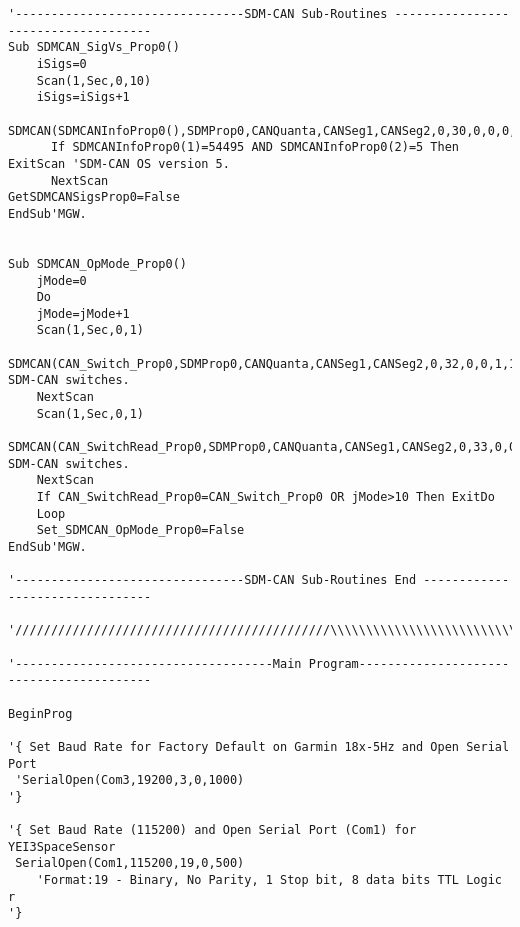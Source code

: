 \begin{lstlisting}[basicstyle=\tiny]
'--------------------------------SDM-CAN Sub-Routines ------------------------------------
Sub SDMCAN_SigVs_Prop0()
    iSigs=0
    Scan(1,Sec,0,10)
    iSigs=iSigs+1
    SDMCAN(SDMCANInfoProp0(),SDMProp0,CANQuanta,CANSeg1,CANSeg2,0,30,0,0,0,1.0,0.0)
      If SDMCANInfoProp0(1)=54495 AND SDMCANInfoProp0(2)=5 Then ExitScan 'SDM-CAN OS version 5.
      NextScan
GetSDMCANSigsProp0=False
EndSub'MGW.


Sub SDMCAN_OpMode_Prop0()
    jMode=0
    Do
    jMode=jMode+1
    Scan(1,Sec,0,1)
    SDMCAN(CAN_Switch_Prop0,SDMProp0,CANQuanta,CANSeg1,CANSeg2,0,32,0,0,1,1.0,0.0)'Set SDM-CAN switches.
    NextScan
    Scan(1,Sec,0,1)
    SDMCAN(CAN_SwitchRead_Prop0,SDMProp0,CANQuanta,CANSeg1,CANSeg2,0,33,0,0,1,1.0,0.0)'Read SDM-CAN switches.
    NextScan
    If CAN_SwitchRead_Prop0=CAN_Switch_Prop0 OR jMode>10 Then ExitDo
    Loop
    Set_SDMCAN_OpMode_Prop0=False
EndSub'MGW.

'--------------------------------SDM-CAN Sub-Routines End --------------------------------

'////////////////////////////////////////////\\\\\\\\\\\\\\\\\\\\\\\\\\\\\\\\\\\\\\\\\\\\\

'------------------------------------Main Program-----------------------------------------

BeginProg
  
'{ Set Baud Rate for Factory Default on Garmin 18x-5Hz and Open Serial Port
 'SerialOpen(Com3,19200,3,0,1000)
'}
  
'{ Set Baud Rate (115200) and Open Serial Port (Com1) for YEI3SpaceSensor
 SerialOpen(Com1,115200,19,0,500)    
    'Format:19 - Binary, No Parity, 1 Stop bit, 8 data bits TTL Logic r
'}
  

\end{lstlisting}
